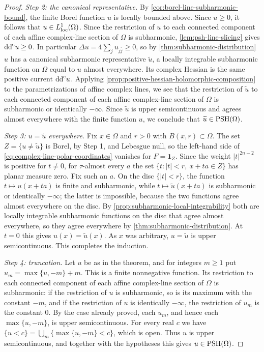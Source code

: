 \begin{proof}
\emph{Step 2: the canonical representative.} By \cref{cor:borel-line-subharmonic-bound}, the finite Borel function $u$ is locally bounded above. Since $u\geq0$, it follows that $u\in L^1_{\mathrm{loc}}(\Omega)$. Since the restriction of $u$ to each connected component of each affine complex-line section of $\Omega$ is subharmonic, \cref{lem:psh-line-slicing} gives $\mathrm{dd}^{\mathrm{c}} u\geq0$. In particular $\Delta u=4\sum_ju_{j\bar j}\geq0$, so by \cref{thm:subharmonic-distribution} $u$ has a canonical subharmonic representative $\widetilde u$, a locally integrable subharmonic function on $\Omega$ equal to $u$ almost everywhere. Its complex Hessian is the same positive current $\mathrm{dd}^{\mathrm{c}} u$. Applying \cref{prop:positive-hessian-holomorphic-composition} to the parametrizations of affine complex lines, we see that the restriction of $\widetilde u$ to each connected component of each affine complex-line section of $\Omega$ is subharmonic or identically $-\infty$. Since $\widetilde u$ is upper semicontinuous and agrees almost everywhere with the finite function $u$, we conclude that $\widetilde u\in\mathrm{PSH}(\Omega)$.

\emph{Step 3: $u=\widetilde u$ everywhere.} Fix $x\in\Omega$ and $r>0$ with $\overline{B(x,r)}\subset\Omega$. The set $Z=\{u\ne\widetilde u\}$ is Borel, by Step 1, and Lebesgue null, so the left-hand side of \eqref{eq:complex-line-polar-coordinates} vanishes for $F=\mathbf1_Z$. Since the weight $|t|^{2n-2}$ is positive for $t\neq0$, for $\tau$-almost every $a$ the set $\{t:|t|<r,\ x+ta\in Z\}$ has planar measure zero. Fix such an $a$. On the disc $\{|t|<r\}$, the function $t\mapsto u(x+ta)$ is finite and subharmonic, while $t\mapsto\widetilde u(x+ta)$ is subharmonic or identically $-\infty$; the latter is impossible, because the two functions agree almost everywhere on the disc. By \cref{prop:subharmonic-local-integrability} both are locally integrable subharmonic functions on the disc that agree almost everywhere, so they agree everywhere by \cref{thm:subharmonic-distribution}. At $t=0$ this gives $u(x)=\widetilde u(x)$. As $x$ was arbitrary, $u=\widetilde u$ is upper semicontinuous. This completes the induction.

\emph{Step 4: truncation.} Let $u$ be as in the theorem, and for integers $m\geq1$ put $u_m=\max\{u,-m\}+m$. This is a finite nonnegative function. Its restriction to each connected component of each affine complex-line section of $\Omega$ is subharmonic: if the restriction of $u$ is subharmonic, so is its maximum with the constant $-m$, and if the restriction of $u$ is identically $-\infty$, the restriction of $u_m$ is the constant $0$. By the case already proved, each $u_m$, and hence each $\max\{u,-m\}$, is upper semicontinuous. For every real $c$ we have $\{u<c\}=\bigcup_m\{\max\{u,-m\}<c\}$, which is open. Thus $u$ is upper semicontinuous, and together with the hypotheses this gives $u\in\mathrm{PSH}(\Omega)$.
\end{proof}

